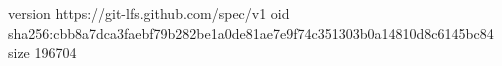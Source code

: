 version https://git-lfs.github.com/spec/v1
oid sha256:cbb8a7dca3faebf79b282be1a0de81ae7e9f74c351303b0a14810d8c6145bc84
size 196704
